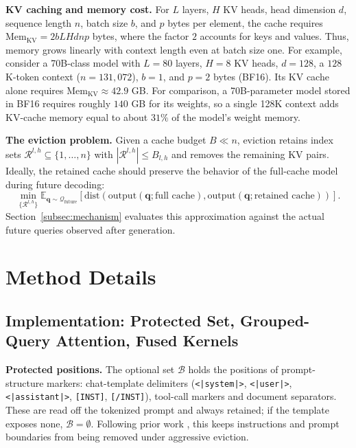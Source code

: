 \documentclass{article} %
\begin{document}
\textbf{KV caching and memory cost.}
For $L$ layers, $H$ KV heads, head dimension $d$, sequence length $n$, batch size $b$, and $p$ bytes per element, the cache requires $\mathrm{Mem}_{\mathrm{KV}} = 2bLHdnp$ bytes, where the factor $2$ accounts for keys and values. Thus, memory grows linearly with context length even at batch size one. For example, consider a 70B-class model with $L=80$ layers, $H=8$ KV heads, $d=128$, a $128$K-token context ($n=131{,}072$), $b=1$, and $p=2$ bytes (BF16). Its KV cache alone requires $\mathrm{Mem}_{\mathrm{KV}}\approx42.9$ GB. For comparison, a 70B-parameter model stored in BF16 requires roughly $140$ GB for its weights, so a single 128K context adds KV-cache memory equal to about $31\%$ of the model's weight memory.

\textbf{The eviction problem.}
\label{app:kv_eviction_problem}
Given a cache budget $B\ll n$, eviction retains index sets
$\mathcal{R}^{l,h}\subseteq\{1,\ldots,n\}$ with
$|\mathcal{R}^{l,h}|\le B_{l,h}$ and removes the remaining KV pairs. Ideally, the retained cache should preserve the behavior of the full-cache model during future decoding:
\begin{equation}
\min_{\{\mathcal{R}^{l,h}\}}
\mathbb{E}_{\mathbf{q}\sim\mathcal{Q}_{\mathrm{future}}}
\left[
\mathrm{dist}\!\left(
\mathrm{output}(\mathbf{q};\text{full cache}),
\mathrm{output}(\mathbf{q};\text{retained cache})
\right)
\right].
\label{eq:eviction_objective}
\end{equation}
Section~\ref{subsec:mechanism} evaluates this approximation against the actual future queries observed after generation.

\section{Method Details} \label{app:method_details}

\subsection{Implementation: Protected Set, Grouped-Query Attention, Fused Kernels}
\label{app:implementation}
\label{app:setup_details}
\label{app:gqa}
\label{app:kernels}

\textbf{Protected positions.}
The optional set $\mathcal{B}$ holds the positions of prompt-structure markers: chat-template delimiters (\verb!<|system|>!, \verb!<|user|>!, \verb!<|assistant|>!, \verb![INST]!, \verb![/INST]!), tool-call markers and document separators. These are read off the tokenized prompt and always retained; if the template exposes none, $\mathcal{B}=\emptyset$. Following prior work \citep{xiao2023streamingllm,li2024snapkv}, this keeps instructions and prompt boundaries from being removed under aggressive eviction. 
\end{document}
